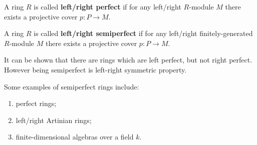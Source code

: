 \documentclass[12pt]{article}
\begin{document}
A ring $R$ is called \textbf{left/right perfect} if for any left/right $R$-module $M$ there exists a projective cover $p:P\to M$.

A ring $R$ is called \textbf{left/right semiperfect} if for any left/right finitely-generated $R$-module $M$ there exists a projective cover $p:P\to M$.

It can be shown that there are rings which are left perfect, but not right perfect. However being semiperfect is left-right symmetric property.

Some examples of semiperfect rings include:
\begin{enumerate}
\item perfect rings;
\item left/right Artinian rings;
\item finite-dimensional algebras over a field $k$.
\end{enumerate}
\end{document}
